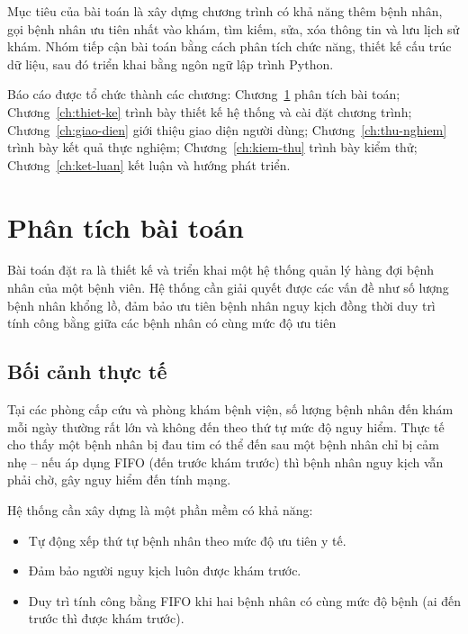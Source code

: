 \documentclass[12pt,a4paper]{report}
\begin{document}
Mục tiêu của bài toán là xây dựng chương trình có khả năng thêm bệnh nhân,
gọi bệnh nhân ưu tiên nhất vào khám, tìm kiếm, sửa, xóa thông tin và lưu
lịch sử khám. Nhóm tiếp cận bài toán bằng cách phân tích chức năng, thiết
kế cấu trúc dữ liệu, sau đó triển khai bằng ngôn ngữ lập trình Python.

Báo cáo được tổ chức thành các chương: Chương~\ref{ch:phan-tich} phân tích
bài toán; Chương~\ref{ch:thiet-ke} trình bày thiết kế hệ thống và cài đặt
chương trình; Chương~\ref{ch:giao-dien} giới thiệu giao diện người dùng;
Chương~\ref{ch:thu-nghiem} trình bày kết quả thực nghiệm;
Chương~\ref{ch:kiem-thu} trình bày kiểm thử; Chương~\ref{ch:ket-luan}
kết luận và hướng phát triển.

\chapter{Phân tích bài toán}
\label{ch:phan-tich}

Bài toán đặt ra là thiết kế và triển khai một hệ thống quản lý hàng đợi bệnh nhân của một bệnh viên. Hệ thống cần giải quyết được các vấn đề như số lượng bệnh nhân khổng lồ, đảm bảo ưu tiên bệnh nhân nguy kịch đồng thời duy trì tính công bằng giữa các bệnh nhân có cùng mức độ ưu tiên

\section{Bối cảnh thực tế}

Tại các phòng cấp cứu và phòng khám bệnh viện, số lượng bệnh nhân đến khám
mỗi ngày thường rất lớn và không đến theo thứ tự mức độ nguy hiểm. Thực tế
cho thấy một bệnh nhân bị đau tim có thể đến sau một bệnh nhân chỉ bị cảm
nhẹ -- nếu áp dụng FIFO (đến trước khám trước) thì bệnh nhân nguy kịch vẫn
phải chờ, gây nguy hiểm đến tính mạng.

Hệ thống cần xây dựng là một phần mềm có khả năng:
\begin{itemize}
  \item Tự động xếp thứ tự bệnh nhân theo mức độ ưu tiên y tế.
  \item Đảm bảo người nguy kịch luôn được khám trước.
  \item Duy trì tính công bằng FIFO khi hai bệnh nhân có cùng mức độ bệnh
        (ai đến trước thì được khám trước).
\end{itemize}
\end{document}
